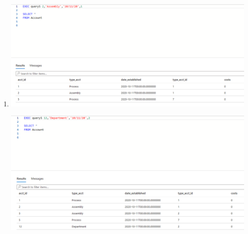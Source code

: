 \documentclass[11pt]{article}
\begin{document}
\begin{enumerate}
\item
\includegraphics[width = \textwidth]{insertAcct1.png}

\includegraphics[width = \textwidth]{insertAcct2.png}
\end{enumerate}
\end{document}
